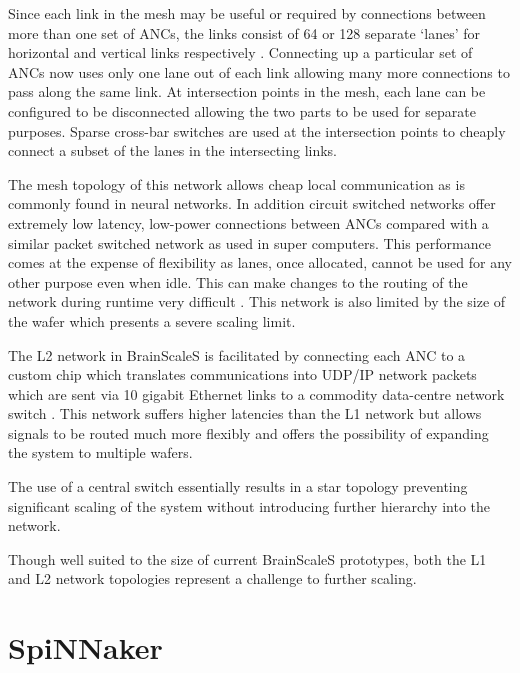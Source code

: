 				Since each link in the mesh may be useful or required by connections
				between more than one set of ANCs, the links consist of 64 or 128
				separate `lanes' for horizontal and vertical links respectively
				\cite{fieres08}. Connecting up a particular set of ANCs now uses only
				one lane out of each link allowing many more connections to pass along
				the same link. At intersection points in the mesh, each lane can be
				configured to be disconnected allowing the two parts to be used for
				separate purposes. Sparse cross-bar switches are used at the
				intersection points to cheaply connect a subset of the lanes in the
				intersecting links.
				
				The mesh topology of this network allows cheap local communication as is
				commonly found in neural networks.  In addition circuit switched
				networks offer extremely low latency, low-power connections between ANCs
				compared with a similar packet switched network as used in super
				computers. This performance comes at the expense of flexibility as
				lanes, once allocated, cannot be used for any other purpose even when
				idle. This can make changes to the routing of the network during runtime
				very difficult \cite{dally04}. This network is also limited by the size
				of the wafer which presents a severe scaling limit.
				
				The L2 network in BrainScaleS is facilitated by connecting each ANC to a
				custom chip which translates communications into UDP/IP network packets
				which are sent via 10 gigabit Ethernet links to a commodity data-centre
				network switch \cite{schemmel10}. This network suffers higher latencies
				than the L1 network but allows signals to be routed much more flexibly
				and offers the possibility of expanding the system to multiple wafers.
				
				The use of a central switch essentially results in a star topology
				preventing significant scaling of the system without introducing further
				hierarchy into the network.
				
				Though well suited to the size of current BrainScaleS prototypes, both
				the L1 and L2 network topologies represent a challenge to further
				scaling.
	
	\section{SpiNNaker}
		
		\label{sec:spinnaker}
		
